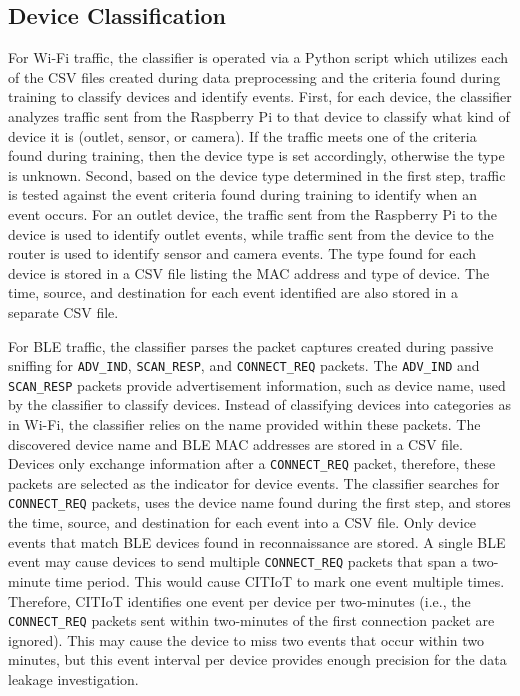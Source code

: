 \documentclass[journal]{./IEEEtran/IEEEtran}
\begin{document}
\subsection{Device Classification}
For Wi-Fi traffic, the classifier is operated via a Python script which utilizes each of the \ac{CSV} files created during data preprocessing and the criteria found during training to classify devices and identify events. First, for each device, the classifier analyzes traffic sent from the Raspberry Pi to that device to classify what kind of device it is (outlet, sensor, or camera). If the traffic meets one of the criteria found during training, then the device type is set accordingly, otherwise the type is unknown. Second, based on the device type determined in the first step, traffic is tested against the event criteria found during training to identify when an event occurs. For an outlet device, the traffic sent from the Raspberry Pi to the device is used to identify outlet events, while traffic sent from the device to the router is used to identify sensor and camera events. The type found for each device is stored in a \ac{CSV} file listing the \ac{MAC} address and type of device. The time, source, and destination for each event identified are also stored in a separate \ac{CSV} file.

For \ac{BLE} traffic, the classifier parses the packet captures created during passive sniffing for \texttt{ADV\_IND}, \texttt{SCAN\_RESP}, and \texttt{CONNECT\_REQ} packets. The \texttt{ADV\_IND} and \texttt{SCAN\_RESP} packets provide advertisement information, such as device name, used by the classifier to classify devices. Instead of classifying devices into categories as in Wi-Fi, the classifier relies on the name provided within these packets. The discovered device name and \ac{BLE} \ac{MAC} addresses are stored in a \ac{CSV} file. Devices only exchange information after a \texttt{CONNECT\_REQ} packet, therefore, these packets are selected as the indicator for device events. The classifier searches for \texttt{CONNECT\_REQ} packets, uses the device name found during the first step, and stores the time, source, and destination for each event into a \ac{CSV} file. Only device events that match \ac{BLE} devices found in reconnaissance are stored. A single \ac{BLE} event may cause devices to send multiple \texttt{CONNECT\_REQ} packets that span a two-minute time period. This would cause \ac{CITIoT} to mark one event multiple times. Therefore, \ac{CITIoT} identifies one event per device per two-minutes (i.e., the \texttt{CONNECT\_REQ} packets sent within two-minutes of the first connection packet are ignored). This may cause the device to miss two events that occur within two minutes, but this event interval per device provides enough precision for the data leakage investigation.
\end{document}
